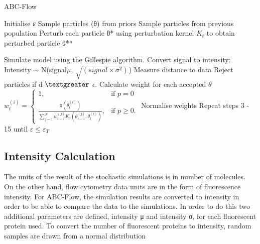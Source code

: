 \begin{algorithm}[htbp]

\caption{ABC-Flow}
\label{alg:abc-flow}
 \begin{algorithmic}[1]
 	\Statex
 	
	\State Initialise ε
		\State Sample particles (θ) from priors
		\Else
			\State Sample particles from previous population
			\State Perturb each particle θ* using perturbation kernel $K_t$ to obtain perturbed particle θ** %

	\EndIf
	\State Simulate model using the Gillespie algorithm.
	\State Convert signal to intensity: 
					\State Intensity $\sim$ N\bigg(signal\times$\mu$,  $\sqrt{(signal\times\sigma^2)}$\bigg)
	\EndFor				
	\EndFor	
	\EndFor	
	\EndFor	
	\State Measure distance to data
	\State Reject particles if d $\textgreater$ $\epsilon$.
    \State Calculate weight for each accepted $\theta$
	\State $w_{t}^{(i)} = \begin{cases} 1, & \mbox{if } p = 0 \\\frac{\pi(\theta_{t}^{(i)})}{\sum_{j=1}^N w_{t-1}^{(j)} K_{t}(\theta_{t-1}^{(j)}, \theta_{t}^{(i)})}, & \mbox{if } p \geq  0. \end{cases}$
	\State Normalise weights
	\State Repeat steps 3 - 15 until $ε \leq ε_T$	%
  \end{algorithmic}
\end{algorithm}
\clearpage
\subsection{Intensity Calculation}

The units of the result of the stochastic simulations is in number of molecules. On the other hand, flow cytometry data units are in the form of fluorescence intensity. For ABC-Flow, the simulation results are converted to intensity in order to be able to compare the data to the simulations. In order to do this two additional parameters are defined, intensity μ and intensity σ, for each fluorescent protein used. To convert the number of fluorescent proteins to intensity, random samples are drawn from a normal distribution

